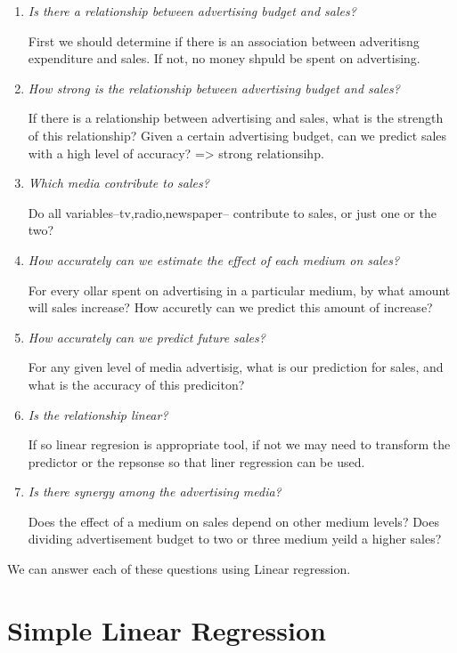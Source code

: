 \documentclass[
  letterpaper,
  DIV=11,
  numbers=noendperiod]{scrreprt}
\begin{document}
\begin{enumerate}
\def\labelenumi{\arabic{enumi}.}
\item
  \emph{Is there a relationship between advertising budget and sales?}

  First we should determine if there is an association between
  adveritisng expenditure and sales. If not, no money shpuld be spent on
  advertising.
\item
  \emph{How strong is the relationship between advertising budget and
  sales?}

  If there is a relationship between advertising and sales, what is the
  strength of this relationship? Given a certain advertising budget, can
  we predict sales with a high level of accuracy? =\textgreater{} strong
  relationsihp.
\item
  \emph{Which media contribute to sales?}

  Do all variables--tv,radio,newspaper-- contribute to sales, or just
  one or the two?
\item
  \emph{How accurately can we estimate the effect of each medium on
  sales?}

  For every ollar spent on advertising in a particular medium, by what
  amount will sales increase? How accuretly can we predict this amount
  of increase?
\item
  \emph{How accurately can we predict future sales?}

  For any given level of media advertisig, what is our prediction for
  sales, and what is the accuracy of this prediciton?
\item
  \emph{Is the relationship linear?}

  If so linear regresion is appropriate tool, if not we may need to
  transform the predictor or the repsonse so that liner regression can
  be used.
\item
  \emph{Is there synergy among the advertising media?}

  Does the effect of a medium on sales depend on other medium levels?
  Does dividing advertisement budget to two or three medium yeild a
  higher sales?
\end{enumerate}

We can answer each of these questions using Linear regression.

\hypertarget{simple-linear-regression}{%
\section{Simple Linear Regression}\label{simple-linear-regression}}
\end{document}

